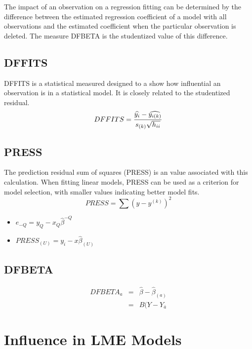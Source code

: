 \documentclass[12pt, a4paper]{article}
\begin{document}
	The impact of an observation on a regression fitting can be determined by the difference between the estimated regression coefficient of a model with all observations and the estimated coefficient when the particular observation is deleted. The measure DFBETA is the studentized value of this difference.
	
	
	\subsection{DFFITS} %
	DFFITS is a statistical measured designed to a show how influential an observation is in a statistical model. It is closely related to the studentized residual.
	\begin{displaymath} DFFITS = {\widehat{y_i} -
		\widehat{y_{i(k)}} \over s_{(k)} \sqrt{h_{ii}}} \end{displaymath}
	
	
	\subsection{PRESS} %
	The prediction residual sum of squares (PRESS) is an value associated with this calculation. When fitting linear models, PRESS can be used as a criterion for model selection, with smaller values indicating better model fits.
	\begin{equation}
	PRESS = \sum(y-y^{(k)})^2
	\end{equation}
	
	
	\begin{itemize}
		\item $e_{-Q} = y_{Q} - x_{Q}\hat{\beta}^{-Q}$
		\item $PRESS_{(U)} = y_{i} - x\hat{\beta}_{(U)}$
	\end{itemize}
	
	\subsection*{DFBETA} %
	\begin{eqnarray}
	DFBETA_{a} &=& \hat{\beta} - \hat{\beta}_{(a)} \\
	&=& B(Y-Y_{\bar{a}}
	\end{eqnarray}
	\section{Influence in LME Models}
	
\end{document}
